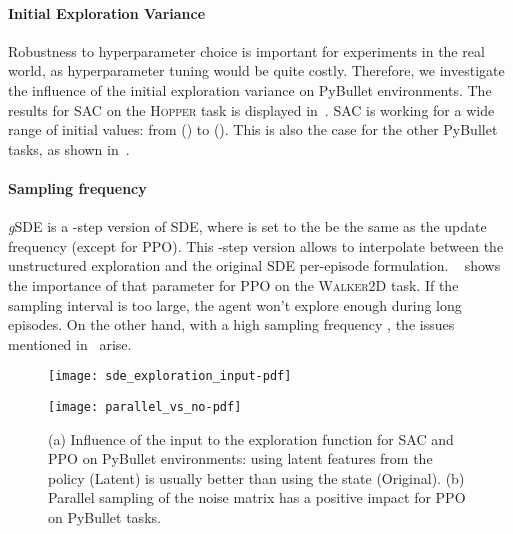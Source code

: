 \documentclass{article}
\newcommand{\SDE}{\textsc{SDE}\xspace}
\newcommand{\ourSDE}{\textit{g}\textsc{SDE}\xspace}
\newcommand{\ppo}{\textsc{PPO}\xspace}
\newcommand{\sac}{\textsc{SAC}\xspace}
\newcommand{\hopper}{\textsc{Hopper}\xspace}
\newcommand{\walker}{\textsc{Walker2D}\xspace}
\begin{document}
\paragraph{Initial Exploration Variance}

Robustness to hyperparameter choice is important for experiments in the real world, as hyperparameter tuning would be quite costly. Therefore, we investigate the influence of the initial exploration variance  on PyBullet environments. The results for \sac on the \hopper task is displayed in~. \sac is working for a wide range of initial values: from  () to  (). This is also the case for the other PyBullet tasks, as shown in~.


\paragraph{Sampling frequency}

\ourSDE is a -step version of \SDE, where  is set to the be the same as the update frequency (except for \ppo). This -step version allows to interpolate between the unstructured exploration  and the original \SDE per-episode formulation.
~ shows the importance of that parameter for \ppo on the \walker task.
If the sampling interval is too large, the agent won't explore enough during long episodes. On the other hand, with a high sampling frequency , the issues mentioned in~ arise.




\begin{figure}[h]
  \begin{minipage}[t]{.5\linewidth}
    \centering\texttt{[image: sde\_exploration\_input-pdf]}
    \label{fig:sde-features}
  \end{minipage}
  \begin{minipage}[t]{.5\linewidth}
    \centering\texttt{[image: parallel\_vs\_no-pdf]}
    \label{fig:ppo-parallel}
  \end{minipage}
  \caption{(a) Influence of the input to the exploration function  for \sac and \ppo on PyBullet environments: using latent features from the policy  (Latent) is usually better than using the state  (Original). (b) Parallel sampling of the noise matrix has a positive impact for \ppo on PyBullet tasks.}
  \label{fig:ablation}
\end{figure}
\end{document}
